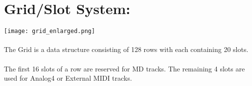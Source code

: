 \chapter{Grid/Slot System:}

\texttt{[image: grid\_enlarged.png]}
\\\\
The Grid is a data structure consisting of 128 rows with each containing 20 slots. \\
\\
The first 16 slots of a row are reserved for MD tracks. The remaining 4 slots are used for Analog4 or External MIDI tracks.


